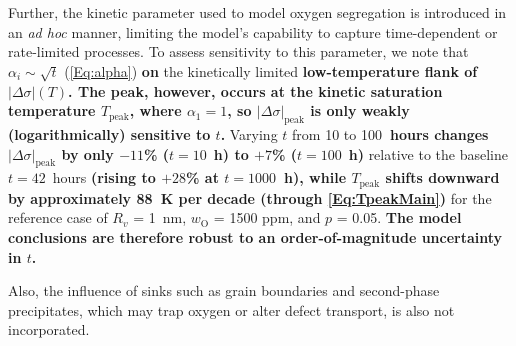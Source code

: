 \documentclass[preprint,12pt,sort&compress]{elsarticle}
\newcommand{\?}{\stackrel{?}{=}}
\providecommand{\DIFaddtex}[1]{{\bf #1}} %
\providecommand{\DIFdeltex}[1]{} %
\providecommand{\DIFaddbegin}{\protect\color{blue}} %
\providecommand{\DIFaddend}{\protect\color{black}} %
\providecommand{\DIFdelbegin}{\protect\color{red}} %
\providecommand{\DIFdelend}{\protect\color{black}} %
\providecommand{\DIFadd}[1]{\texorpdfstring{\DIFaddtex{#1}}{#1}} %
\providecommand{\DIFdel}[1]{\texorpdfstring{\DIFdeltex{#1}}{}} %
\begin{document}
Further, the kinetic parameter used to model oxygen segregation is introduced in an \textit{ad hoc} manner, limiting the model's capability to capture time-dependent or rate-limited processes. To assess sensitivity to this parameter, we note that $\alpha_i \sim \sqrt{t}$ (\cref{Eq:alpha}) \DIFdelbegin \DIFdel{, so that $|\Delta \sigma|$ in }\DIFdelend \DIFaddbegin \DIFadd{on }\DIFaddend the kinetically limited \DIFdelbegin \DIFdel{regime scales as $\sqrt{t}$. }\DIFdelend \DIFaddbegin \DIFadd{low-temperature flank of $|\Delta \sigma|(T)$. The peak, however, occurs at the kinetic saturation temperature $T_\text{peak}$, where $\alpha_1 = 1$, so $|\Delta \sigma|_\text{peak}$ is only weakly (logarithmically) sensitive to $t$. }\DIFaddend Varying $t$ from 10 to 100\DIFdelbegin \DIFdel{hours, $|\Delta \sigma|$ decreases by $\sim$51\% for }\DIFdelend \DIFaddbegin \DIFadd{~hours changes $|\Delta \sigma|_\text{peak}$ by only $-11$\% (}\DIFaddend $t = 10$~\DIFdelbegin \DIFdel{hours and increases by $\sim$54\% for }\DIFdelend \DIFaddbegin \DIFadd{h) to $+7$\% (}\DIFaddend $t = 100$~\DIFdelbegin \DIFdel{hours, }\DIFdelend \DIFaddbegin \DIFadd{h) }\DIFaddend relative to the baseline $t = 42$~hours \DIFdelbegin \DIFdel{. Note that the temperature at which $|\Delta \sigma|$ is maximized also depends on $t$ but only logarithmically (through \cref{Eq:TpeakMain}), giving a downward shift of approximately 80~K over the order-of-magnitude range $t = 10$--100~hours }\DIFdelend \DIFaddbegin \DIFadd{(rising to $+28$\% at $t = 1000$~h), while $T_\text{peak}$ shifts downward by approximately 88~K per decade (through \cref{Eq:TpeakMain}) }\DIFaddend for the reference case of $R_v$ = 1~nm, $w_\text{O}$ = 1500 ppm, and $p$ = 0.05. \DIFaddbegin \DIFadd{The model conclusions are therefore robust to an order-of-magnitude uncertainty in $t$.
}\DIFaddend 

Also, the influence of sinks such as grain boundaries and second-phase precipitates, which may trap oxygen or alter defect transport, is also not incorporated.
\end{document}
